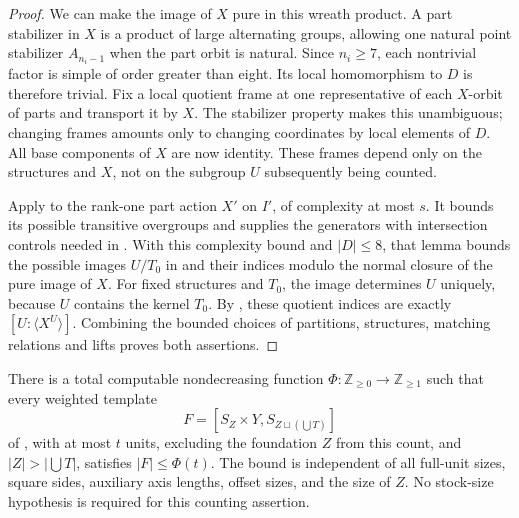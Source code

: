 \begin{proof}
We can make the image of $X$ pure in this wreath product.
A part stabilizer in $X$ is a product of large
alternating groups, allowing one natural point
stabilizer $A_{n_i-1}$ when the part orbit is natural.
Since $n_i\ge7$, each nontrivial factor is simple of
order greater than eight.  Its local homomorphism to
$D$ is therefore trivial.  Fix a local quotient frame
at one representative of each $X$-orbit of parts and
transport it by $X$.  The stabilizer property makes
this unambiguous; changing frames amounts only to
changing coordinates by local elements of $D$.
All base components of $X$ are now identity.  These
frames depend only on the structures and $X$, not
on the subgroup $U$ subsequently being counted.

Apply  to the rank-one part action
$X'$ on $I'$, of complexity at most $s$.  It bounds its possible transitive
overgroups and supplies the generators with
intersection controls needed in .
With this complexity bound and $|D|\le8$, that lemma bounds the possible images
$U/T_0$ in  and their indices
modulo the normal closure of the pure image of $X$.
For fixed structures and $T_0$, the image determines
$U$ uniquely, because $U$ contains the kernel $T_0$.
By , these quotient indices
are exactly $[U:\langle X^U\rangle]$.  Combining the
bounded choices of partitions, structures, matching
relations and lifts proves both assertions.
\end{proof}

\begin{theorem}\label{n:template-bound}
There is a total computable nondecreasing function
$\Phi:\mathbb Z_{\ge0}\to\mathbb Z_{\ge1}$ such that every weighted
template
\[
 F=[S_Z\times Y,S_{Z\sqcup(\bigcup T)}]
\]
of , with at most $t$ units, excluding
the foundation $Z$ from this count, and
$|Z|>|\bigcup T|$, satisfies $|F|\le\Phi(t)$.
The bound is independent of all full-unit sizes, square sides,
auxiliary axis lengths, offset sizes, and the size of $Z$.
No stock-size hypothesis is required for this counting assertion.
\end{theorem}


